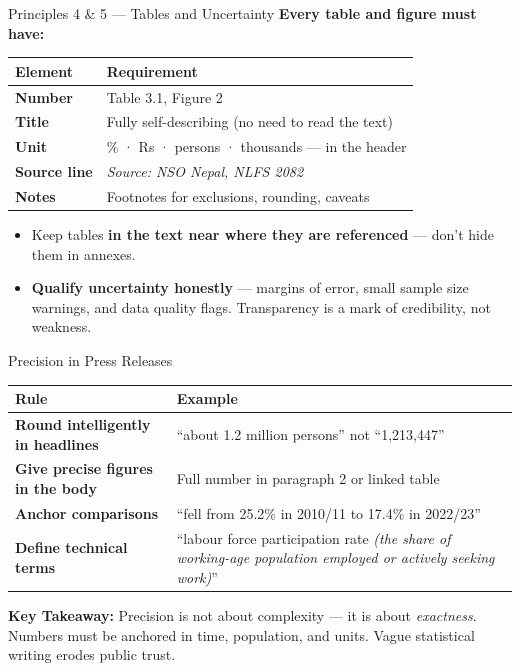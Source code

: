 \documentclass[xcolor={table,dvipsnames},aspectratio=169,11pt]{beamer}
\begin{document}
\begin{frame}{Principles 4 \& 5 --- Tables and Uncertainty}
    \textbf{Every table and figure must have:}
    \footnotesize
    \begin{tabular}{lp{10cm}}
    \toprule
    \rowcolor{nsoBlue}\color{white}\bfseries Element & \color{white}\bfseries Requirement \\
    \midrule
    \textbf{Number} & Table 3.1, Figure 2 \\
    \textbf{Title} & Fully self-describing (no need to read the text) \\
    \textbf{Unit} & \% · Rs · persons · thousands --- in the header \\
    \textbf{Source line} & \emph{Source: NSO Nepal, NLFS 2082} \\
    \textbf{Notes} & Footnotes for exclusions, rounding, caveats \\
    \bottomrule
    \end{tabular}
    \vskip 0.2cm
    \begin{itemize}
        \item Keep tables \textbf{in the text near where they are referenced} --- don't hide them in annexes.
        \item \textbf{Qualify uncertainty honestly} --- margins of error, small sample size warnings, and data quality flags. Transparency is a mark of credibility, not weakness.
    \end{itemize}
\end{frame}

\begin{frame}{Precision in Press Releases}
    \small
    \begin{tabular}{lp{9cm}}
    \toprule
    \rowcolor{nsoBlue}\color{white}\bfseries Rule & \color{white}\bfseries Example \\
    \midrule
    \textbf{Round intelligently in headlines} & ``about 1.2 million persons'' not ``1,213,447'' \\
    \textbf{Give precise figures in the body} & Full number in paragraph 2 or linked table \\
    \textbf{Anchor comparisons} & ``fell from 25.2\% in 2010/11 to 17.4\% in 2022/23'' \\
    \textbf{Define technical terms} & ``labour force participation rate \textit{(the share of working-age population employed or actively seeking work)}'' \\
    \bottomrule
    \end{tabular}
    \vskip 0.2cm
    \begin{takeawaybox}
    \scriptsize \textbf{Key Takeaway:} Precision is not about complexity --- it is about \emph{exactness}. Numbers must be anchored in time, population, and units. Vague statistical writing erodes public trust.
    \end{takeawaybox}
\end{frame}
\end{document}
